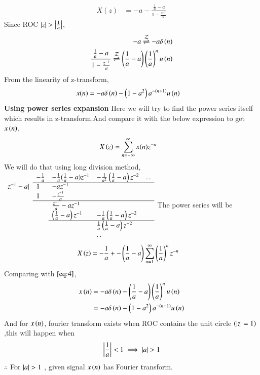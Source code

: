 \documentclass[journal,12pt,twocolumn]{IEEEtran}
\begin{document}
     \begin{align}
       X(z) &=  -a - \frac{\frac{1}{a} - a}{1 - \frac{z^{-1}}{a}}
     \end{align}
    Since ROC $\left\vert z\right\vert > \left\vert\frac{1}{a}\right\vert$,
     \begin{align}
         -a \overset{\mathcal{Z}}{ \rightleftharpoons} -a\delta\left(n\right)\\
         \frac{\frac{1}{a} - a}{1 - \frac{z^{-1}}{a}} \overset{\mathcal{Z}}{ \rightleftharpoons} \left(\frac{1}{a} - a\right)\left(\frac{1}{a}\right)^nu\left(n\right)\\
     \end{align}
     From the linearity of z-transform,
     \begin{align}
       x(n) &= -a\delta\left(n\right) -\left(1-a^2\right)a^{-\left(n+1\right)}u\left(n\right)
     \end{align}
    \textbf{Using power series expansion} Here we will try to find the power series itself which results in z-transform.And compare it with the below expression to get $x\left(n\right)$,
      \begin{align}
        X\left(z\right) &= \sum_{n=-\infty}^{\infty}x(n)z^{-n}\label{eq:4}
      \end{align}
    We will do that using long division method,\\
    $\begin{array}{llllll}
      & -\frac{1}{a} & -\frac{1}{a}(\frac{1}{a}-a)z^{-1}&-\frac{1}{a^2}\brak{\frac{1}{a}-a}z^{-2}&.\,. \\\cline{2-5}
      z^{-1} - a| & 1& -az^{-1}  \\
      & 1 & -\frac{z^{-1}}{a}  \\\cline{2-5}
      & & \frac{z^{-1}}{a} -az^{-1}& \\
      & & \brak{\frac{1}{a}-a}z^{-1} & -\frac{1}{a}\brak{\frac{1}{a}-a}z^{-2} & \\\cline{3-5}
      & & & \frac{1}{a}\brak{\frac{1}{a} - a}z^{-2} \\
      & & & .\,.
      \end{array}$
     The power series will be
      \begin{align}
        X\left(z\right) &= -\frac{1}{a}+ -\left(\frac{1}{a} - a\right)\sum_{n=1}^{\infty}\left(\frac{1}{a}\right)^{n}z^{-n}
      \end{align}         
      Comparing with $\eqref{eq:4}$,
       \begin{align}
         x\left(n\right) &= -a\delta\left(n\right) - \left(\frac{1}{a} - a\right)\left(\frac{1}{a}\right)^nu\left(n\right) \\
                   &=  -a\delta\left(n\right) -\left(1-a^2\right)a^{-\left(n+1\right)}u\left(n\right)
       \end{align}
      And for $x\left(n\right)$, fourier transform exists when ROC contains the unit circle $\left(\left\vert z\right\vert = 1\right)$,this will happen when 
      \begin{align}
         \left\vert\frac{1}{a}\right\vert < 1
         \implies \left\vert a\right\vert > 1
      \end{align}
      $\therefore$ For $\left\vert a\right\vert > 1$ , given signal $x\left(n\right)$ has Fourier transform.  
      
\end{document}

